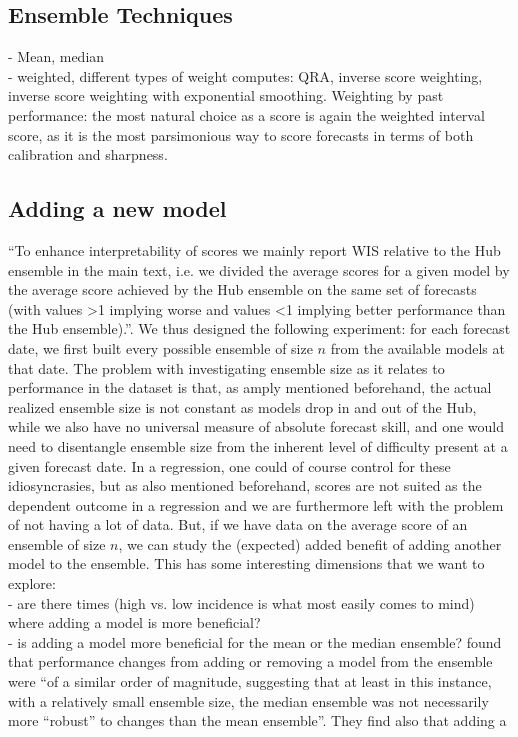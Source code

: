 \subsection{Ensemble Techniques}
- Mean, median \\
- weighted, different types of weight computes: QRA, inverse score weighting, inverse score weighting with exponential smoothing.
Weighting by past performance: the most natural choice as a score is again the weighted interval score, as it is the most parsimonious way to score forecasts in terms of both calibration and sharpness. 
\subsection{Adding a new model}
``To enhance
interpretability of scores we mainly report WIS relative to the Hub ensemble in the main text, i.e. we divided
the average scores for a given model by the average score achieved by the Hub ensemble on the same set of
forecasts (with values >1 implying worse and values <1 implying better performance than the Hub ensemble).''\cite{bosse_comparing_2021-1}.
We thus designed the following experiment: for each forecast date, we first built every possible ensemble of size $n$ from the available models at that date. The problem with investigating ensemble size as it relates to performance in the dataset is that, as amply mentioned beforehand, the actual realized ensemble size is not constant as models drop in and out of the Hub, while we also have no universal measure of absolute forecast skill, and one would need to disentangle ensemble size from the inherent level of difficulty present at a given forecast date. In a regression, one could of course control for these idiosyncrasies, but as also mentioned beforehand, scores are not suited as the dependent outcome in a regression and we are furthermore left with the problem of not having a lot of data. But, if we have data on the average score of an ensemble of size $n$, we can study the (expected) added benefit of adding another model to the ensemble. This has some interesting dimensions that we want to explore:\\
- are there times (high vs. low incidence is what most easily comes to mind) where adding a model is more beneficial?\\
- is adding a model more beneficial for the mean or the median ensemble? \cite{bosse_comparing_2021-1} found that performance changes from adding or removing a model from the ensemble were ``of a similar order of magnitude, suggesting that at least in this instance, with a relatively small ensemble size, the median ensemble was not necessarily more ``robust'' to changes than the mean ensemble''. They find also that adding a 
